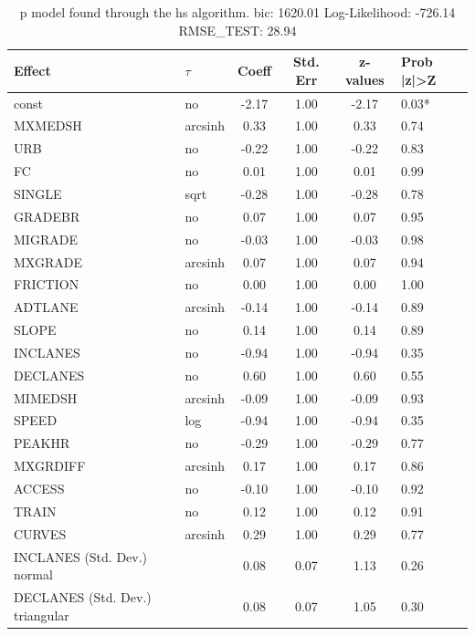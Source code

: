 \begin{table}
	\caption{p model found through the hs algorithm. bic: 1620.01 Log-Likelihood: -726.14 RMSE_TEST: 28.94}
	\begin{center}
		\begin{tabular}{|l|l|c|c|c|l|}
			\hline
			Effect & $\tau$ & Coeff & Std. Err & z-values & Prob |z|>Z \\
			\hline
			const & no & -2.17 & 1.00 & -2.17 & 0.03* \\
			\hline
			MXMEDSH & arcsinh & 0.33 & 1.00 & 0.33 & 0.74 \\
			\hline
			URB & no & -0.22 & 1.00 & -0.22 & 0.83 \\
			\hline
			FC & no & 0.01 & 1.00 & 0.01 & 0.99 \\
			\hline
			SINGLE & sqrt & -0.28 & 1.00 & -0.28 & 0.78 \\
			\hline
			GRADEBR & no & 0.07 & 1.00 & 0.07 & 0.95 \\
			\hline
			MIGRADE & no & -0.03 & 1.00 & -0.03 & 0.98 \\
			\hline
			MXGRADE & arcsinh & 0.07 & 1.00 & 0.07 & 0.94 \\
			\hline
			FRICTION & no & 0.00 & 1.00 & 0.00 & 1.00 \\
			\hline
			ADTLANE & arcsinh & -0.14 & 1.00 & -0.14 & 0.89 \\
			\hline
			SLOPE & no & 0.14 & 1.00 & 0.14 & 0.89 \\
			\hline
			INCLANES & no & -0.94 & 1.00 & -0.94 & 0.35 \\
			\hline
			DECLANES & no & 0.60 & 1.00 & 0.60 & 0.55 \\
			\hline
			MIMEDSH & arcsinh & -0.09 & 1.00 & -0.09 & 0.93 \\
			\hline
			SPEED & log & -0.94 & 1.00 & -0.94 & 0.35 \\
			\hline
			PEAKHR & no & -0.29 & 1.00 & -0.29 & 0.77 \\
			\hline
			MXGRDIFF & arcsinh & 0.17 & 1.00 & 0.17 & 0.86 \\
			\hline
			ACCESS & no & -0.10 & 1.00 & -0.10 & 0.92 \\
			\hline
			TRAIN & no & 0.12 & 1.00 & 0.12 & 0.91 \\
			\hline
			CURVES & arcsinh & 0.29 & 1.00 & 0.29 & 0.77 \\
			\hline
			INCLANES (Std. Dev.) normal &  & 0.08 & 0.07 & 1.13 & 0.26 \\
			\hline
			DECLANES (Std. Dev.) triangular &  & 0.08 & 0.07 & 1.05 & 0.30 \\

\end{tabular}
\end{center}
\end{table}
